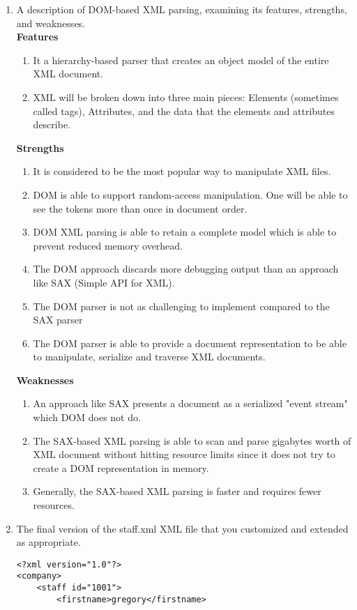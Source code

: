 \documentclass[11pt,english]{article}
\begin{document}
\begin{enumerate}
\newpage
\item A description of DOM-based XML parsing, examining its features, strengths, and weaknesses.
\\
	\textbf{Features}
		\begin{enumerate}
			\item It a hierarchy-based parser that creates an object model of the entire XML document.
			\item XML will be broken down into three main pieces: Elements (sometimes called tags), Attributes, and the data that the elements and attributes describe.
		\end{enumerate}
	\textbf{Strengths}
		\begin{enumerate}
			\item It is considered to be the most popular way to manipulate XML files.
			\item DOM is able to support random-access manipulation. One will be able to see the tokens more than once in document order. 
			\item DOM XML parsing is able to retain a complete model which is able to prevent reduced memory overhead.
			\item The DOM approach discards more debugging output than an approach like SAX (Simple API for XML).
			\item The DOM parser is not as challenging to implement compared to the SAX parser
			\item The DOM parser is able to provide a document representation to be able to manipulate, serialize and traverse XML documents.
		\end{enumerate}
	\textbf{Weaknesses}
		\begin{enumerate}
			\item An approach like SAX presents a document as a serialized "event stream" which DOM does not do.
			\item The SAX-based XML parsing is able to scan and parse gigabytes worth of XML document without hitting resource limits since it does not try to create a DOM representation in memory.
			\item Generally, the SAX-based XML parsing is faster and requires fewer resources.
		\end{enumerate}
\newpage
\item The final version of the staff.xml XML file that you customized and extended as appropriate.
\begin{lstlisting}
<?xml version="1.0"?>
<company>
    <staff id="1001">
        <firstname>gregory</firstname>

\end{lstlisting}
\end{enumerate}
\end{document}
